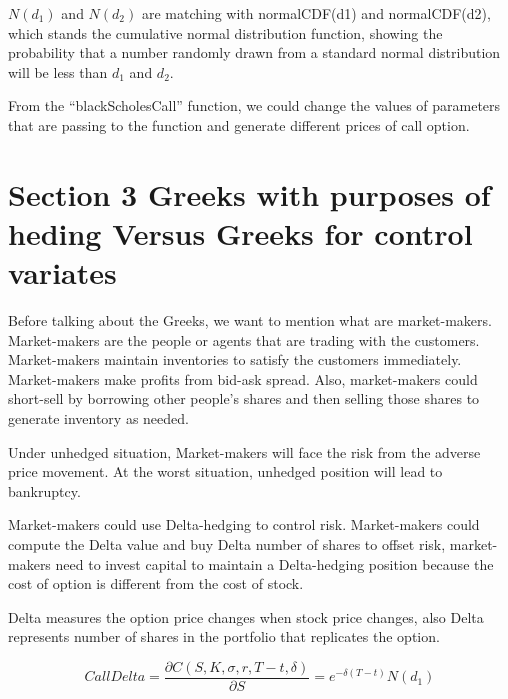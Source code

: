 \documentclass[11pt,]{article}
\begin{document}
\(N(d_1)\) and \(N(d_2)\) are matching with normalCDF(d1) and
normalCDF(d2), which stands the cumulative normal distribution function,
showing the probability that a number randomly drawn from a standard
normal distribution will be less than \(d_1\) and \(d_2\).

From the ``blackScholesCall'' function, we could change the values of
parameters that are passing to the function and generate different
prices of call option.

\section{Section 3 Greeks with purposes of heding Versus Greeks for
control
variates}\label{section-3-greeks-with-purposes-of-heding-versus-greeks-for-control-variates}

Before talking about the Greeks, we want to mention what are
market-makers. Market-makers are the people or agents that are trading
with the customers. Market-makers maintain inventories to satisfy the
customers immediately. Market-makers make profits from bid-ask spread.
Also, market-makers could short-sell by borrowing other people's shares
and then selling those shares to generate inventory as needed.

Under unhedged situation, Market-makers will face the risk from the
adverse price movement. At the worst situation, unhedged position will
lead to bankruptcy.

Market-makers could use Delta-hedging to control risk. Market-makers
could compute the Delta value and buy Delta number of shares to offset
risk, market-makers need to invest capital to maintain a Delta-hedging
position because the cost of option is different from the cost of stock.

Delta measures the option price changes when stock price changes, also
Delta represents number of shares in the portfolio that replicates the
option.

\[
Call Delta= \frac{\partial C(S, K, \sigma, r, T - t, \delta)}{\partial S} = e^{-\delta (T - t)} N(d_{1}) 
\]
\end{document}

